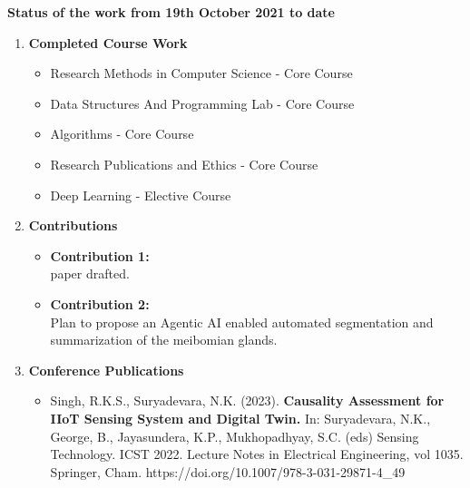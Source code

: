 \documentclass{article}
\begin{document}
\large{\textbf{Status of the work from 19{th} October 2021 to date}}
\begin{enumerate}
    \item \normalsize{\textbf{Completed Course Work}}
    \begin{itemize}
        \item Research Methods in Computer Science - Core Course 
        \item Data Structures And Programming Lab - Core Course
        \item Algorithms - Core Course
        \item Research Publications and Ethics - Core Course
        \item Deep Learning - Elective Course
    \end{itemize}
    \item \normalsize{\textbf{Contributions}}

    \begin{itemize}
        \item \normalsize{\textbf{Contribution 1:}}\\
      paper drafted. %

       \item \normalsize{\textbf{Contribution 2:}}\\
    Plan to propose an Agentic AI enabled automated segmentation and summarization of the meibomian glands.
    
    \end{itemize}

    \item \normalsize{\textbf{Conference Publications}}
    \begin{itemize}   
    \item 
    Singh, R.K.S., Suryadevara, N.K. (2023). \textbf{Causality Assessment for IIoT Sensing System and Digital Twin.} In: Suryadevara, N.K., George, B., Jayasundera, K.P., Mukhopadhyay, S.C. (eds) Sensing Technology. ICST 2022. Lecture Notes in Electrical Engineering, vol 1035. Springer, Cham. https://doi.org/10.1007/978-3-031-29871-4\_49


\end{itemize}
\end{enumerate}
\end{document}
